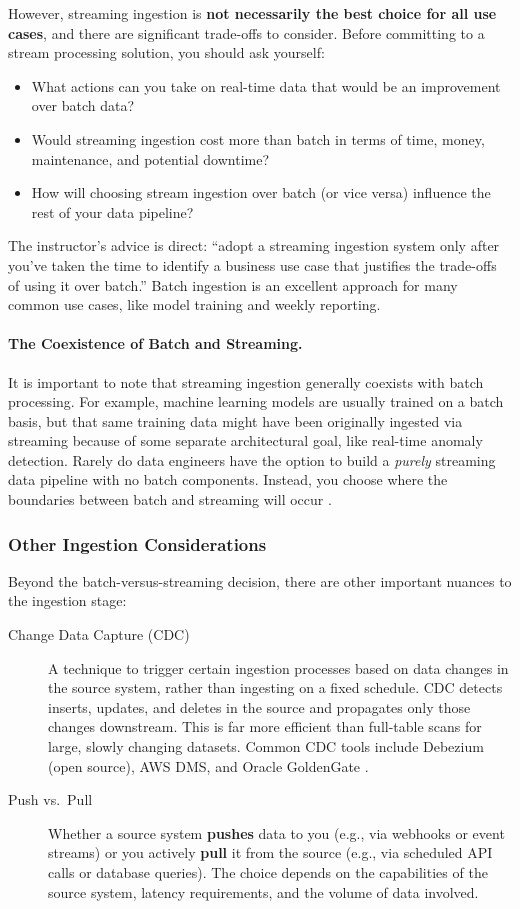 \documentclass{article}
\begin{document}
However, streaming ingestion is \textbf{not necessarily the best choice for all use cases}, and there are significant trade-offs to consider. Before committing to a stream processing solution, you should ask yourself:
\begin{itemize}
    \item What actions can you take on real-time data that would be an improvement over batch data?
    \item Would streaming ingestion cost more than batch in terms of time, money, maintenance, and potential downtime?
    \item How will choosing stream ingestion over batch (or vice versa) influence the rest of your data pipeline?
\end{itemize}

The instructor's advice is direct: ``adopt a streaming ingestion system only after you've taken the time to identify a business use case that justifies the trade-offs of using it over batch.'' Batch ingestion is an excellent approach for many common use cases, like model training and weekly reporting.

\paragraph{The Coexistence of Batch and Streaming.} It is important to note that streaming ingestion generally coexists with batch processing. For example, machine learning models are usually trained on a batch basis, but that same training data might have been originally ingested via streaming because of some separate architectural goal, like real-time anomaly detection. Rarely do data engineers have the option to build a \textit{purely} streaming data pipeline with no batch components. Instead, you choose where the boundaries between batch and streaming will occur \cite{reis2022fundamentals, kleppmann2017designing}.

\subsubsection{Other Ingestion Considerations}
Beyond the batch-versus-streaming decision, there are other important nuances to the ingestion stage:
\begin{description}
    \item[Change Data Capture (CDC)] A technique to trigger certain ingestion processes based on data changes in the source system, rather than ingesting on a fixed schedule. CDC detects inserts, updates, and deletes in the source and propagates only those changes downstream. This is far more efficient than full-table scans for large, slowly changing datasets. Common CDC tools include Debezium (open source), AWS DMS, and Oracle GoldenGate \cite{kleppmann2017designing}.

    \item[Push vs.\ Pull] Whether a source system \textbf{pushes} data to you (e.g., via webhooks or event streams) or you actively \textbf{pull} it from the source (e.g., via scheduled API calls or database queries). The choice depends on the capabilities of the source system, latency requirements, and the volume of data involved.
\end{description}
\end{document}
